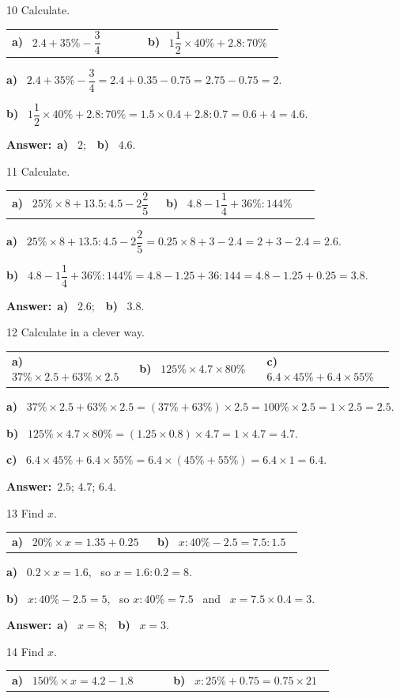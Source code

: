 \documentclass[11pt]{article}
\makeatletter
\newif\ifsol \solfalse
\renewcommand{\arraystretch}{1.35}
\providecommand{\AnsWord}{Đáp số}
\newcommand{\dapso}[1]{\par\textbf{\AnsWord:}\ #1}
\newcommand{\probsol}[1]{%
  \begin{lrbox}{\solmeasure}\begin{minipage}{\dimexpr\linewidth-24pt\relax}#1\end{minipage}\end{lrbox}%
  \ifsol
    \begin{solbox}#1\end{solbox}%
  \else
    \setlength{\solht}{\dimexpr\ht\solmeasure+\dp\solmeasure+0.85cm\relax}%
    \ifdim\solht<1.35cm\setlength{\solht}{1.35cm}\fi
    \begin{tcolorbox}[colback=white,colframe=Line,boxrule=0.8pt,arc=5pt,
      left=8pt,right=8pt,top=4pt,bottom=4pt,height=\solht]{\footnotesize\color{Slate}\itshape\WorkWord}\end{tcolorbox}%
  \fi}
\newcommand{\pa}[1]{\textbf{#1)}\ }
\newenvironment{cols2}{\par\vspace{3pt}\noindent\setlength{\tabcolsep}{0pt}\renewcommand{\arraystretch}{1.3}%
  \begin{tabular}{@{}>{\raggedright\arraybackslash\rule{0pt}{4.4ex}}p{0.48\linewidth}<{\rule[-2.3ex]{0pt}{0pt}}@{\hspace{0.03\linewidth}}>{\raggedright\arraybackslash\rule{0pt}{4.4ex}}p{0.48\linewidth}<{\rule[-2.3ex]{0pt}{0pt}}@{}}}%
  {\end{tabular}\par}
\newenvironment{cols3}{\par\vspace{3pt}\noindent\setlength{\tabcolsep}{0pt}\renewcommand{\arraystretch}{1.3}%
  \begin{tabular}{@{}>{\raggedright\arraybackslash\rule{0pt}{4.4ex}}p{0.32\linewidth}<{\rule[-2.3ex]{0pt}{0pt}}@{\hspace{0.015\linewidth}}>{\raggedright\arraybackslash\rule{0pt}{4.4ex}}p{0.32\linewidth}<{\rule[-2.3ex]{0pt}{0pt}}@{\hspace{0.015\linewidth}}>{\raggedright\arraybackslash\rule{0pt}{4.4ex}}p{0.32\linewidth}<{\rule[-2.3ex]{0pt}{0pt}}@{}}}%
  {\end{tabular}\par}
\newcommand{\gap}{\vspace{0.3cm}}
\def\WorkWord{Your work:}
\def\AnsWord{Answer}
\makeatother
\begin{document}
\gap
\begin{probbox}{10}{\relax}
Calculate.
\begin{cols2}
\pa{a} $2.4+35\%-\dfrac34$ & \pa{b} $1\dfrac12\times40\%+2.8:70\%$
\end{cols2}
\end{probbox}
\probsol{
\pa{a} $2.4+35\%-\dfrac34=2.4+0.35-0.75=2.75-0.75=2$.\par
\pa{b} $1\dfrac12\times40\%+2.8:70\%=1.5\times0.4+2.8:0.7=0.6+4=4.6$.
\dapso{\pa{a} $2$;\ \ \pa{b} $4.6$.}}
\gap
\begin{probbox}{11}{\relax}
Calculate.
\begin{cols2}
\pa{a} $25\%\times8+13.5:4.5-2\dfrac25$ & \pa{b} $4.8-1\dfrac14+36\%:144\%$
\end{cols2}
\end{probbox}
\probsol{
\pa{a} $25\%\times8+13.5:4.5-2\dfrac25=0.25\times8+3-2.4=2+3-2.4=2.6$.\par
\pa{b} $4.8-1\dfrac14+36\%:144\%=4.8-1.25+36:144=4.8-1.25+0.25=3.8$.
\dapso{\pa{a} $2.6$;\ \ \pa{b} $3.8$.}}
\gap
\begin{probbox}{12}{\relax}
Calculate in a clever way.
\begin{cols3}
\pa{a} $37\%\times2.5+63\%\times2.5$ & \pa{b} $125\%\times4.7\times80\%$ & \pa{c} $6.4\times45\%+6.4\times55\%$
\end{cols3}
\end{probbox}
\probsol{
\pa{a} $37\%\times2.5+63\%\times2.5=(37\%+63\%)\times2.5=100\%\times2.5=1\times2.5=2.5$.\par
\pa{b} $125\%\times4.7\times80\%=(1.25\times0.8)\times4.7=1\times4.7=4.7$.\par
\pa{c} $6.4\times45\%+6.4\times55\%=6.4\times(45\%+55\%)=6.4\times1=6.4$.
\dapso{$2.5$; $4.7$; $6.4$.}}
\gap
\begin{probbox}{13}{\relax}
Find $x$.
\begin{cols2}
\pa{a} $20\%\times x=1.35+0.25$ & \pa{b} $x:40\%-2.5=7.5:1.5$
\end{cols2}
\end{probbox}
\probsol{
\pa{a} $0.2\times x=1.6$, \ so $x=1.6:0.2=8$.\par
\pa{b} $x:40\%-2.5=5$, \ so $x:40\%=7.5$ \ and \ $x=7.5\times0.4=3$.
\dapso{\pa{a} $x=8$;\ \ \pa{b} $x=3$.}}
\gap
\begin{probbox}{14}{\relax}
Find $x$.
\begin{cols2}
\pa{a} $150\%\times x=4.2-1.8$ & \pa{b} $x:25\%+0.75=0.75\times21$
\end{cols2}
\end{probbox}
\end{document}
